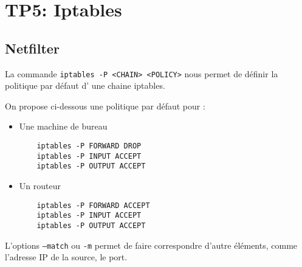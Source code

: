 \chapter{TP5: Iptables}

\section{Netfilter}
La commande \texttt{iptables -P <CHAIN> <POLICY>} nous permet de définir la politique par défaut d' une chaine iptables.

On propose ci-dessous une politique par défaut pour :
\begin{itemize}
  \item Une machine de bureau
  \begin{verbatim}
    iptables -P FORWARD DROP
    iptables -P INPUT ACCEPT
    iptables -P OUTPUT ACCEPT
  \end{verbatim}
  \item Un routeur
  \begin{verbatim}
    iptables -P FORWARD ACCEPT
    iptables -P INPUT ACCEPT
    iptables -P OUTPUT ACCEPT
  \end{verbatim}
\end{itemize}

L'options \texttt{--match} ou \texttt{-m} permet de faire correspondre d'autre éléments, comme l'adresse IP de la source, le port.

